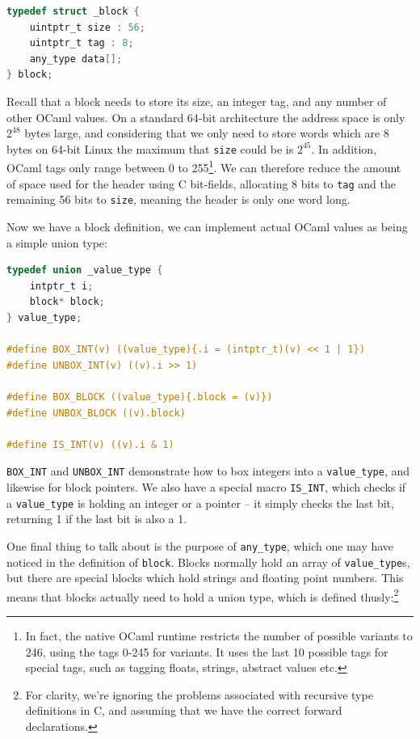 \documentclass[12pt,a4paper,twoside,openright]{report}
\begin{document}
\begin{lstlisting}[language=C]
typedef struct _block {
    uintptr_t size : 56;
    uintptr_t tag : 8;
    any_type data[];
} block;
\end{lstlisting}

Recall that a block needs to store its size, an integer tag, and any number of 
other OCaml values. On a standard 64-bit architecture the address space is only 
$2^{48}$ bytes large, and considering that we only need to store words which 
are 8 bytes on 64-bit Linux the maximum that \texttt{size} could be is $2^{45}$.
In addition, OCaml tags only range between 0 to 255\footnote{In fact, the 
native OCaml runtime restricts the number of possible variants to 246, using 
the tags 0-245 for variants. It uses the last 10 possible tags for special 
tags, such as tagging floats, strings, abstract values etc.}. We can therefore 
reduce the amount of space used for the header using C bit-fields, allocating 8 
bits to \texttt{tag} and the remaining 56 bits to \texttt{size}, meaning the 
header is only one word long.

Now we have a block definition, we can implement actual OCaml values as being a 
simple union type:

\begin{lstlisting}[language=C]
typedef union _value_type {
    intptr_t i;
    block* block;
} value_type;

#define BOX_INT(v) ((value_type){.i = (intptr_t)(v) << 1 | 1})
#define UNBOX_INT(v) ((v).i >> 1)

#define BOX_BLOCK ((value_type){.block = (v)})
#define UNBOX_BLOCK ((v).block)

#define IS_INT(v) ((v).i & 1)
\end{lstlisting}

\verb|BOX_INT| and \verb|UNBOX_INT| demonstrate how to box integers into a 
\verb|value_type|, and likewise for block pointers. We also have a special 
macro \verb|IS_INT|, which checks if a \verb|value_type| is holding an integer 
or a pointer -- it simply checks the last bit, returning 1 if the last bit is 
also a 1.

One final thing to talk about is the purpose of \verb|any_type|, which one may 
have noticed in the definition of \verb|block|. Blocks normally hold an array 
of \verb|value_type|s, but there are special blocks which hold strings and 
floating point numbers. This means that blocks actually need to hold a union 
type, which is defined thusly:\footnote{For clarity, we're ignoring the 
problems associated with recursive type definitions in C, and assuming that we 
have the correct forward declarations.}
\end{document}
